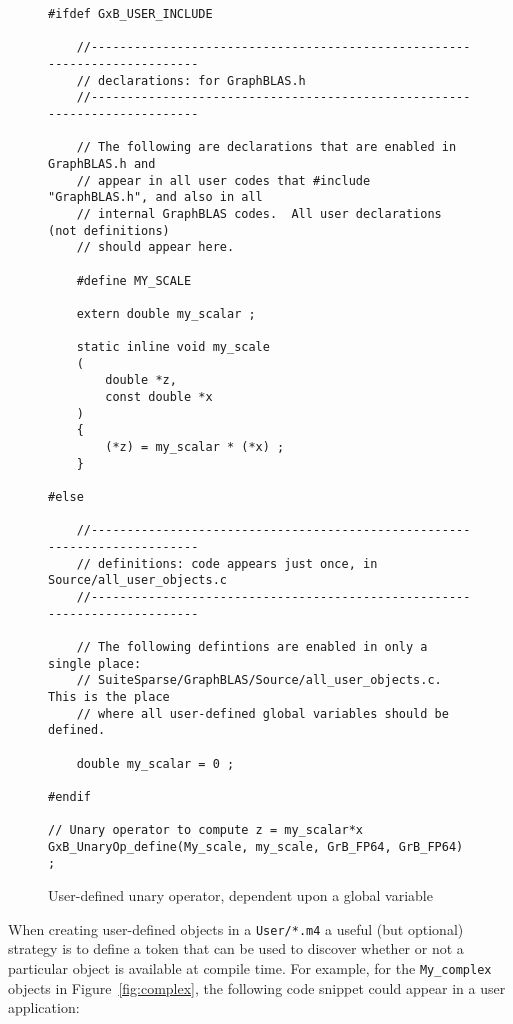 \documentclass[12pt]{article}
\begin{document}
\begin{figure}
\begin{mdframed}[leftmargin=-0.4in,userdefinedwidth=5.8in]
{\footnotesize
\begin{verbatim}
#ifdef GxB_USER_INCLUDE

    //--------------------------------------------------------------------------
    // declarations: for GraphBLAS.h
    //--------------------------------------------------------------------------

    // The following are declarations that are enabled in GraphBLAS.h and
    // appear in all user codes that #include "GraphBLAS.h", and also in all
    // internal GraphBLAS codes.  All user declarations (not definitions)
    // should appear here.

    #define MY_SCALE

    extern double my_scalar ;

    static inline void my_scale
    (
        double *z,
        const double *x
    )
    {
        (*z) = my_scalar * (*x) ;
    }

#else

    //--------------------------------------------------------------------------
    // definitions: code appears just once, in Source/all_user_objects.c
    //--------------------------------------------------------------------------

    // The following defintions are enabled in only a single place:
    // SuiteSparse/GraphBLAS/Source/all_user_objects.c.  This is the place
    // where all user-defined global variables should be defined.

    double my_scalar = 0 ;

#endif

// Unary operator to compute z = my_scalar*x
GxB_UnaryOp_define(My_scale, my_scale, GrB_FP64, GrB_FP64) ; \end{verbatim}}
\end{mdframed}
\caption{User-defined unary operator, dependent upon a global variable
\label{fig:scale}}
\end{figure}

When creating user-defined objects in a \verb'User/*.m4' a useful (but
optional) strategy is to define a token that can be used to discover whether or
not a particular object is available at compile time.  For example, for the
\verb'My_complex' objects in Figure~\ref{fig:complex}, the following code
snippet could appear in a user application:
\end{document}
